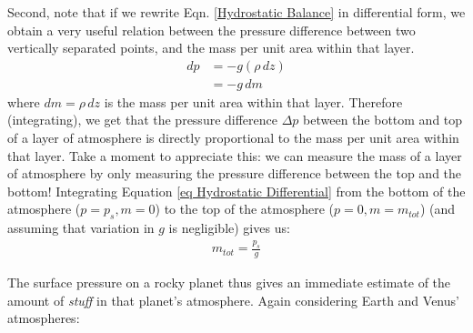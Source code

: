 Second, note that if we rewrite Eqn. \ref{Hydrostatic Balance} in differential form, we obtain a very useful relation between the pressure difference between two vertically separated points, and the mass per unit area within that layer.
\begin{equation}
    \label{eq Hydrostatic Differential}
    \begin{aligned}
        dp& =-g(\rho\, dz) \\
        & = -g \,dm
    \end{aligned}
\end{equation}
where \(dm=\rho\,dz\) is the mass per unit area within that layer. Therefore (integrating), we get that the pressure difference \(\Delta p\) between the bottom and top of a layer of atmosphere is directly proportional to the mass per unit area within that layer. Take a moment to appreciate this: we can measure the mass of a layer of atmosphere by only measuring the pressure difference between the top and the bottom! Integrating Equation \ref{eq Hydrostatic Differential} from the bottom of the atmosphere (\(p=p_s,m=0\)) to the top of the atmosphere (\(p=0,m=m_{tot}\)) (and assuming that variation in \(g\) is negligible) gives us:
\begin{align}\label{Total Mass Hydrostatic}
    m_{tot}=\frac{p_s}{g}
\end{align}

The surface pressure on a rocky planet thus gives an immediate estimate of the amount of \textit{stuff} in that planet's atmosphere. Again considering Earth and Venus' atmospheres:

